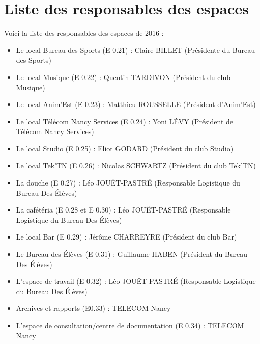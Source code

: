 \documentclass{article} %
\begin{document}
	\section*{Liste des responsables des espaces}

		Voici la liste des responsables des espaces de 2016 :
		\begin{itemize}
			\item Le local Bureau des Sports (E 0.21) : Claire BILLET
				(Présidente du Bureau des Sports)
			\item Le local Musique (E 0.22) : Quentin TARDIVON (Président du
				club Musique)
			\item Le local Anim’Est (E 0.23) : Matthieu ROUSSELLE (Président
				d’Anim’Est)
			\item Le local Télécom Nancy Services (E 0.24) : Yoni LÉVY
				(Président de Télécom Nancy Services)
			\item Le local Studio (E 0.25) : Eliot GODARD (Président du club
				Studio)
			\item Le local Tek’TN (E 0.26) : Nicolas SCHWARTZ (Président du
				club Tek’TN)
			\item La douche (E 0.27) : Léo JOUËT-PASTRÉ (Responsable
				Logistique du Bureau Des Élèves)
			\item La cafétéria (E 0.28 et E 0.30) : Léo JOUËT-PASTRÉ
				(Responsable Logistique du Bureau Des Élèves)
			\item Le local Bar (E 0.29) : Jérôme CHARREYRE (Président du club
				Bar)
			\item Le Bureau des Élèves (E 0.31) : Guillaume HABEN (Président du
				Bureau Des Élèves)
			\item L’espace de travail (E 0.32) : Léo JOUËT-PASTRÉ (Responsable
				Logistique du Bureau Des Élèves)
			\item Archives et rapports (E0.33) : TELECOM Nancy
			\item L'espace de consultation/centre de documentation (E 0.34) :
				TELECOM Nancy
		\end{itemize}
\end{document}
